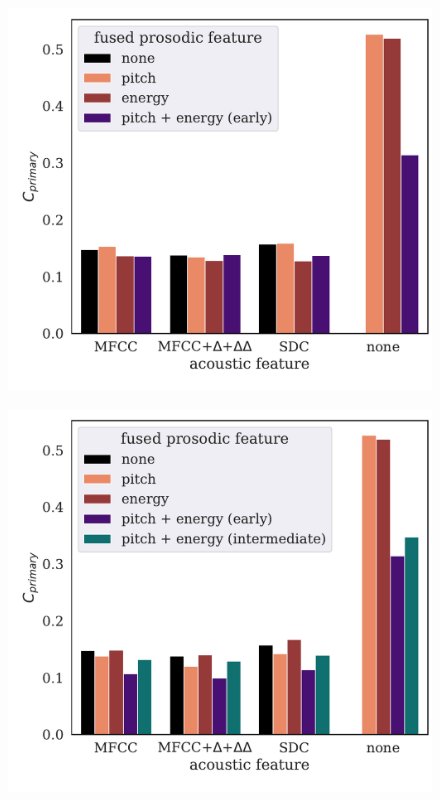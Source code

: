 \documentclass[bsc,frontabs,twoside,singlespacing,parskip,deptreport]{infthesis}
\begin{document}
{\begin{figure}[h!]
\begin{minipage}{0.49\textwidth}
      \label{fig:summary-intermediate-10s}
    \end{minipage}
    \begin{minipage}{0.49\textwidth}
      \centering
      \vspace*{1.5em}      
      \includegraphics[width=\textwidth]{../img/summary-early-3s.pdf}
      \label{fig:summary-early-3s}
    \end{minipage}
    \begin{minipage}{0.49\textwidth}
      \centering
      \vspace*{1.5em} 
      \includegraphics[width=\textwidth]{../img/summary-intermediate-3s.pdf}

\end{minipage}
\end{figure}}
\end{document}
